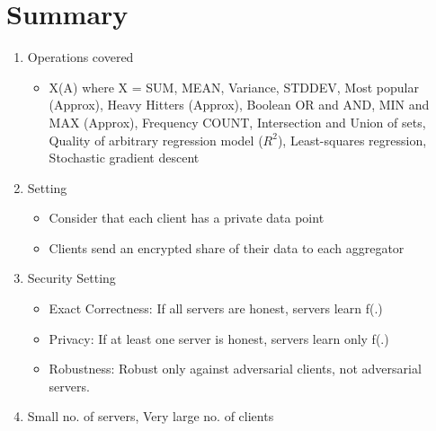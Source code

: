 
\clearpage
{}

%
\setcounter{section}{0} %

\section{Summary}
\begin{enumerate}
    \item Operations covered
    \begin{itemize}
        \item X(A) where X = SUM, MEAN, Variance, STDDEV, Most popular (Approx), Heavy Hitters (Approx), Boolean OR and AND, MIN and MAX (Approx), Frequency COUNT, Intersection and Union of sets, Quality of arbitrary regression model ($R^2$), Least-squares regression, Stochastic gradient descent
    \end{itemize}
    \item Setting
    \begin{itemize}
        \item Consider that each client has a private data point
        \item Clients send an encrypted share of their data to each aggregator

    \end{itemize}
    \item Security Setting
    \begin{itemize}
        \item Exact Correctness: If all servers are honest, servers learn f(.)
        \item Privacy: If at least one server is honest, servers learn only f(.)
        \item Robustness: Robust only against adversarial clients, not adversarial servers. 
    \end{itemize}
    \item Small no. of servers, Very large no. of clients 
\end{enumerate}

